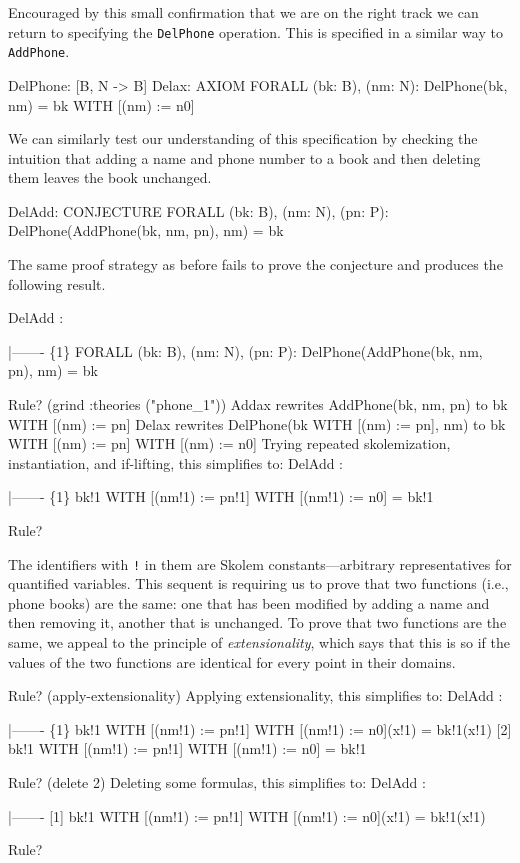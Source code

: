 Encouraged by this small confirmation that we are on the right track
we can return to specifying the {\tt DelPhone} operation.  This is
specified in a similar way to {\tt AddPhone}.
\begin{jmrsession}
  DelPhone: [B, N -> B]
  Delax: AXIOM   FORALL (bk: B), (nm: N): DelPhone(bk, nm) = bk WITH [(nm) := n0]
\end{jmrsession}
We can similarly test our understanding of this specification by
checking the intuition that adding a name and phone number to a book
and then deleting them leaves the book unchanged.
\begin{jmrsession}
  DelAdd: CONJECTURE  FORALL (bk: B), (nm: N), (pn: P):
    DelPhone(AddPhone(bk, nm, pn), nm) = bk
\end{jmrsession}
The same proof strategy as before fails to prove the conjecture and
produces the following result.
\begin{jmrsession}
DelAdd :  

  |-------
\{1\}   FORALL (bk: B), (nm: N), (pn: P): DelPhone(AddPhone(bk, nm, pn), nm) = bk

Rule? (grind :theories ("phone_1"))
Addax rewrites AddPhone(bk, nm, pn)
  to bk WITH [(nm) := pn]
Delax rewrites DelPhone(bk WITH [(nm) := pn], nm)
  to bk WITH [(nm) := pn] WITH [(nm) := n0]
Trying repeated skolemization, instantiation, and if-lifting, this simplifies to: 
DelAdd :  

  |-------
\{1\}   bk!1 WITH [(nm!1) := pn!1] WITH [(nm!1) := n0] = bk!1

Rule?
\end{jmrsession}
The identifiers with {\tt !} in them are Skolem constants---arbitrary
representatives for quantified variables.  This sequent is requiring
us to prove that two functions (i.e., phone books) are the same: one
that has been modified by adding a name and then removing it, another
that is unchanged.  To prove that two functions are the same, we
appeal to the principle of {\em extensionality\/}, which says that
this is so if the values of the two functions are identical for every
point in their domains.
\begin{jmrsession}
Rule? (apply-extensionality)
  Applying extensionality, this simplifies to: 
DelAdd :  

  |-------
\{1\}   bk!1 WITH [(nm!1) := pn!1] WITH [(nm!1) := n0](x!1) = bk!1(x!1)
[2]   bk!1 WITH [(nm!1) := pn!1] WITH [(nm!1) := n0] = bk!1

Rule? (delete 2)
  Deleting some formulas, this simplifies to: 
DelAdd :  

  |-------
[1]   bk!1 WITH [(nm!1) := pn!1] WITH [(nm!1) := n0](x!1) = bk!1(x!1)

Rule? 
\end{jmrsession}
